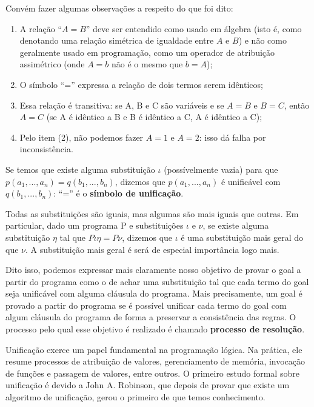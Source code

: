 \documentclass{article}
\theoremstyle{remark}
\theoremstyle{theorem}
\begin{document}
Convém fazer algumas observações a respeito do que foi dito:

\begin{enumerate}
  \item A relação ``$A = B$'' deve ser entendido como usado em álgebra (isto é, como denotando uma relação simétrica de igualdade entre $A$ e $B$) e não como geralmente usado em programação, como um operador de atribuição assimétrico (onde $A = b$ não é o mesmo que $b = A$);
  \item O símbolo ``='' expressa a relação de dois termos serem idênticos;
  \item Essa relação é transitiva: se A, B e C são variáveis e se $A = B$ e $B = C$, então $A = C$ (se A é idêntico a B e B é idêntico a C, A é idêntico a C);
  \item Pelo item (2), não podemos fazer $A = 1$ e $A = 2$: isso dá falha por inconsistência.
\end{enumerate}

Se temos que existe alguma substituição $\iota$ (possívelmente vazia) para que $p(a_1, ..., a_n) = q(b_1, ..., b_n)$, dizemos que  $p(a_1, ..., a_n)$ é unificável com $q(b_1, ..., b_n)$: ``='' é o \textbf{símbolo de unificação}.

Todas as substituições são iguais, mas algumas são mais iguais que outras. Em particular, dado um programa P e substituições $\iota$ e $\nu$, se existe alguma substituição $\eta$ tal que $P\iota\eta = P \nu$, dizemos que $\iota$ é uma substituição mais geral do que $\nu$. A substituição mais geral é será de especial importância logo mais.

Dito isso, podemos expressar mais claramente nosso objetivo de provar o goal a partir do programa como o de achar uma substituição tal que cada termo do goal seja unificável com alguma cláusula do programa. Mais precisamente, um goal é provado a partir do programa se é possível unificar cada termo do goal com algum cláusula do programa de forma a preservar a consistência das regras. O processo pelo qual esse objetivo é realizado é chamado \textbf{processo de resolução}.

Unificação exerce um papel fundamental na programação lógica. Na prática, ele resume processos de atribuição de valores, gerenciamento de memória, invocação de funções e passagem de valores, entre outros. O primeiro estudo formal sobre unificação é devido a John A. Robinson, que depois de provar que existe um algoritmo de unificação, gerou o primeiro de que temos conhecimento.
\end{document}
